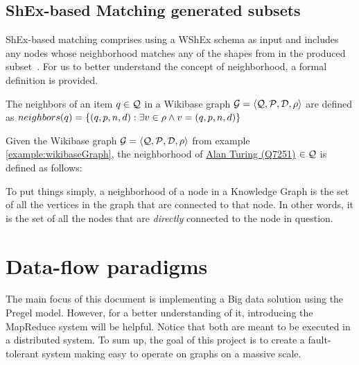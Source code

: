 \begin{table}[ht]
    \centering
    
\end{table}

\subsection{ShEx-based Matching generated subsets}

ShEx-based matching comprises using a WShEx schema  as input and includes any nodes whose neighborhood matches any of the shapes from  in the produced subset~\cite{https://doi.org/10.48550/arxiv.2110.11709}. For us to better understand the concept of neighborhood, a formal definition is provided.

\begin{definition}
    \label{definition:neighborhood}
    The neighbors of an item $q\in\mathcal{Q}$ in a Wikibase graph $\mathcal{G}=\langle\mathcal{Q},\mathcal{P},\mathcal{D},\rho\rangle$ are defined as $neighbors(q)=\{(q,p,n,d): \exists{}v\in\rho \wedge v=(q,p,n,d)\}$
\end{definition}

\begin{example}
    Given the Wikibase graph $\mathcal{G}=\langle\mathcal{Q},\mathcal{P},\mathcal{D},\rho\rangle$ from example \ref{example:wikibaseGraph}, the neighborhood of \href{https://www.wikidata.org/wiki/Q7251}{Alan Turing (Q7251)} $\in \mathcal{Q}$ is defined as follows:
\end{example}

\begin{table}[ht]
    \centering
    
\end{table}

To put things simply, a neighborhood of a node in a Knowledge Graph is the set of all the vertices in the graph that are connected to that node. In other words, it is the set of all the nodes that are \textit{directly} connected to the node in question.

\section{Data-flow paradigms}

The main focus of this document is implementing a Big data solution using the Pregel model. However, for a better understanding of it, introducing the MapReduce system will be helpful. Notice that both are meant to be executed in a distributed system. To sum up, the goal of this project is to create a fault-tolerant system making easy to operate on graphs on a massive scale.

